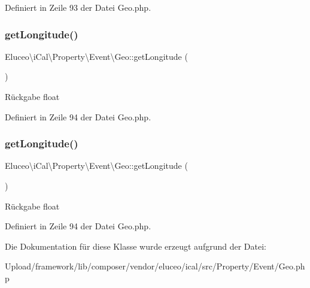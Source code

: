 Definiert in Zeile 93 der Datei Geo.\+php.

\mbox{\label{class_eluceo_1_1i_cal_1_1_property_1_1_event_1_1_geo_ade59098963ef1feaa793994efbf8e521}} 
\subsubsection{\texorpdfstring{get\+Longitude()}{getLongitude()}\hspace{0.1cm}{\footnotesize\ttfamily [2/3]}}
{\footnotesize\ttfamily Eluceo\textbackslash{}i\+Cal\textbackslash{}\+Property\textbackslash{}\+Event\textbackslash{}\+Geo\+::get\+Longitude (\begin{DoxyParamCaption}{ }\end{DoxyParamCaption})}

\begin{DoxyReturn}{Rückgabe}
float 
\end{DoxyReturn}


Definiert in Zeile 94 der Datei Geo.\+php.

\mbox{\label{class_eluceo_1_1i_cal_1_1_property_1_1_event_1_1_geo_ade59098963ef1feaa793994efbf8e521}} 
\subsubsection{\texorpdfstring{get\+Longitude()}{getLongitude()}\hspace{0.1cm}{\footnotesize\ttfamily [3/3]}}
{\footnotesize\ttfamily Eluceo\textbackslash{}i\+Cal\textbackslash{}\+Property\textbackslash{}\+Event\textbackslash{}\+Geo\+::get\+Longitude (\begin{DoxyParamCaption}{ }\end{DoxyParamCaption})}

\begin{DoxyReturn}{Rückgabe}
float 
\end{DoxyReturn}


Definiert in Zeile 94 der Datei Geo.\+php.



Die Dokumentation für diese Klasse wurde erzeugt aufgrund der Datei\+:\begin{DoxyCompactItemize}
\item 
Upload/framework/lib/composer/vendor/eluceo/ical/src/\+Property/\+Event/Geo.\+php\end{DoxyCompactItemize}
